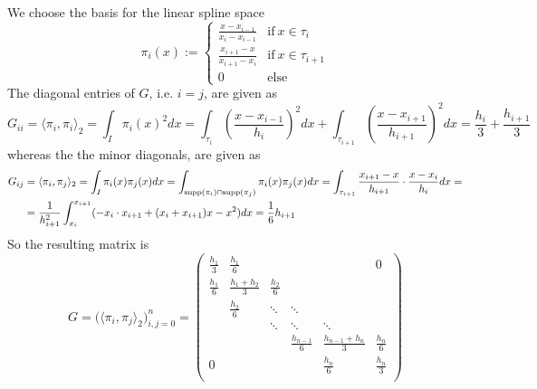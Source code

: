 We choose the basis for the linear spline space
\[\pi_i(x) := \begin{cases}\frac{x - x_{i-1}}{x_i - x_{i-1}} & \text{if}~x \in \tau_i\\ \frac{x_{i+1} - x}{x_{i+1} - x_i} & \text{if}~x \in \tau_{i+1}\\ 0 & \text{else}\end{cases}\]
The diagonal entries of \(G\), i.e. \(i = j\), are given as
\[G_{ii} = \langle \pi_i, \pi_i\rangle_2 = \int_I \pi_i(x)^2 dx = \int_{\tau_i} \left(\frac{x - x_{i-1}}{h_i}\right)^2 dx + \int_{\tau_{i+1}} \left(\frac{x - x_{i+1}}{h_{i+1}}\right)^2dx = \frac{h_i}{3} + \frac{h_{i+1}}{3}\]
whereas the the minor diagonals, are given as
\begin{equation*}
   \begin{split}
      G_{ij} & = \langle \pi_i, \pi_j\rangle_2 = \int_I \pi_i(x) \pi_j(x) dx = \int_{\operatorname{supp}(\pi_i) \cap \operatorname{supp}(\pi_j)} \pi_i(x) \pi_j(x) dx = \int_{\tau_{i+1}} \frac{x_{i+1} - x}{h_{i+1}} \cdot \frac{x - x_i}{h_i}dx =\\
             & = \frac{1}{h_{i+1}^2} \int_{x_i}^{x_{i+1}} (-x_i \cdot x_{i+1} + (x_i + x_{i+1})x - x^2) dx = \frac{1}{6} h_{i+1}
   \end{split}
\end{equation*}
So the resulting matrix is
\[G = \big(\langle \pi_i, \pi_j \rangle_2\big)_{i,j=0}^n =
   \begin{pmatrix}
      \frac{h_1}{3} & \frac{h_1}{6} & & & & 0 \\
      \frac{h_1}{6} & \frac{h_1 + h_2}{3} & \frac{h_2}{6} & & & \\
                    & \frac{h_2}{6} & \ddots & \ddots & & \\
                    &               & \ddots & \ddots  & \ddots                  &     \\
                    &               &        & \frac{h_{n-1}}{6} & \frac{h_{n-1} + h_n}{3} & \frac{h_n}{6} \\
      0             &               &        &         & \frac{h_n}{6}           & \frac{h_n}{3}\\
   \end{pmatrix}
\]

